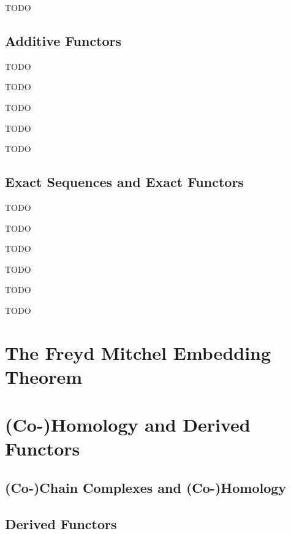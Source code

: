 	\begin{definition}[Quotient]
		TODO
	\end{definition}


	\subsection{Additive Functors}

	\begin{definition}
		TODO
	\end{definition}

	\begin{lemma}
		TODO
	\end{lemma}

	\begin{lemma}
		TODO
	\end{lemma}

	\begin{theorem}
		TODO
	\end{theorem}

	\begin{proposition}
		TODO
	\end{proposition}

	\subsection{Exact Sequences and Exact Functors}

	\begin{definition}
		TODO
	\end{definition}

	\begin{lemma}
		TODO
	\end{lemma}

	\begin{definition}
		TODO
	\end{definition}

	\begin{lemma}
		TODO
	\end{lemma}

	\begin{definition}
		TODO
	\end{definition}

	\begin{lemma}
		TODO
	\end{lemma}

	\newpage
	\section{The Freyd Mitchel Embedding Theorem}

	\newpage
	\section{(Co-)Homology and Derived Functors}
	\subsection{(Co-)Chain Complexes and (Co-)Homology}
	\subsection{Derived Functors}
